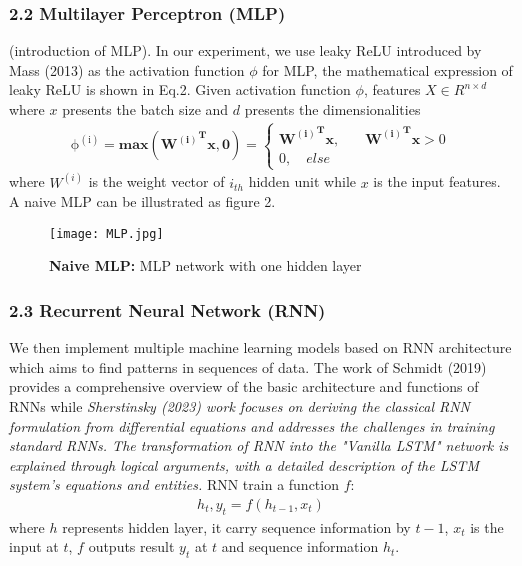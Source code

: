 \documentclass[10pt,letterpaper]{article}
\begin{document}
\subsubsection*{2.2 Multilayer Perceptron (MLP)}

(introduction of MLP).
In our experiment, we use leaky ReLU introduced by Mass (2013) as the activation function \(\phi\) for MLP, the mathematical expression of leaky ReLU  is shown in Eq.2. Given activation function \(\phi\), features \(X \in R^ {n\times d}\) where \(x\) presents the batch size and \(d\) presents the dimensionalities
\begin{eqnarray}
\label{eq:schemeP}
\mathrm{\phi^{(i)}} =\mathbf{max({W^{(i)}}^{T}x,0)}=
\begin{cases}
\mathbf{{W^{(i)}}^{T}x},\quad &\mathbf{{W^{(i)}}^{T}x}>0\\0, \quad else
\end{cases}
\end{eqnarray}
where \(W^{(i)}\) is the weight vector of \(i_{th}\) hidden unit while \(x\) is the input features. A naive MLP can be illustrated as figure 2.
\begin{figure}[!h]
\texttt{[image: MLP.jpg]}
\caption{{\bf Naive MLP:} MLP network with one hidden layer}
\label{fig2}
\end{figure}

\subsubsection*{2.3 Recurrent Neural Network (RNN)}
We then implement multiple machine learning models based on RNN architecture which aims to find patterns in sequences of data. The work of Schmidt (2019) provides a comprehensive overview of the basic architecture and functions of RNNs while \textit{Sherstinsky (2023) work focuses on deriving the classical RNN formulation from differential equations and addresses the challenges in training standard RNNs. The transformation of RNN into the "Vanilla LSTM" network is explained through logical arguments, with a detailed description of the LSTM system's equations and entities. }
RNN train a function $f$:
\begin{eqnarray}
\label{eq: RNN}
    {h_{t}, y_t} = f(h_{t - 1}, x_t)
\end{eqnarray}
where $h$ represents hidden layer, it carry sequence information by $t - 1$, $x_t$ is the input at $t$, $f$ outputs result $y_t$ at $t$ and sequence information $h_t$.
\end{document}

